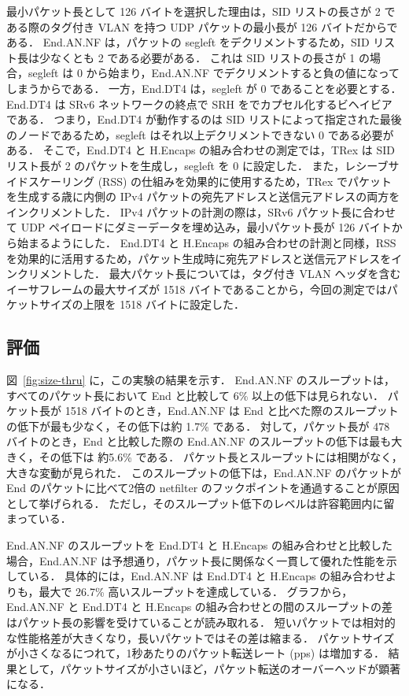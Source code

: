 最小パケット長として 126 バイトを選択した理由は，SID リストの長さが 2 である際のタグ付き VLAN を持つ UDP パケットの最小長が 126 バイトだからである．
End.AN.NF は，パケットの segleft をデクリメントするため，SID リスト長は少なくとも 2 である必要がある．
これは SID リストの長さが 1 の場合，segleft は 0 から始まり，End.AN.NF でデクリメントすると負の値になってしまうからである．
一方，End.DT4 は，segleft が 0 であることを必要とする．
End.DT4 は SRv6 ネットワークの終点で SRH をでカプセル化するビヘイビアである．
つまり，End.DT4 が動作するのは SID リストによって指定された最後のノードであるため，segleft はそれ以上デクリメントできない 0 である必要がある．
そこで，End.DT4 と H.Encaps の組み合わせの測定では，TRex は SID リスト長が 2 のパケットを生成し，segleft を 0 に設定した．
また，レシーブサイドスケーリング (RSS) の仕組みを効果的に使用するため，TRex でパケットを生成する歳に内側の IPv4 パケットの宛先アドレスと送信元アドレスの両方をインクリメントした．
IPv4 パケットの計測の際は，SRv6 パケット長に合わせて UDP ペイロードにダミーデータを埋め込み，最小パケット長が 126 バイトから始まるようにした．
End.DT4 と H.Encaps の組み合わせの計測と同様，RSS を効果的に活用するため，パケット生成時に宛先アドレスと送信元アドレスをインクリメントした．
最大パケット長については，タグ付き VLAN ヘッダを含むイーサフレームの最大サイズが 1518 バイトであることから，今回の測定ではパケットサイズの上限を 1518 バイトに設定した．

\subsection{評価}
\label{ssec:thru-size.eval}
図~\ref{fig:size-thru} に，この実験の結果を示す．
End.AN.NF のスループットは，すべてのパケット長において End と比較して 6\% 以上の低下は見られない．
パケット長が 1518 バイトのとき，End.AN.NF は End と比べた際のスループットの低下が最も少なく，その低下は約 1.7\% である．
対して，パケット長が 478 バイトのとき，End と比較した際の End.AN.NF のスループットの低下は最も大きく，その低下は 約5.6\% である．
パケット長とスループットには相関がなく，大きな変動が見られた．
このスループットの低下は，End.AN.NF のパケットが End のパケットに比べて2倍の netfilter のフックポイントを通過することが原因として挙げられる．
ただし，そのスループット低下のレベルは許容範囲内に留まっている．

End.AN.NF のスループットを End.DT4 と H.Encaps の組み合わせと比較した場合，End.AN.NF は予想通り，パケット長に関係なく一貫して優れた性能を示している．
具体的には，End.AN.NF は End.DT4 と H.Encaps の組み合わせよりも，最大で 26.7\% 高いスループットを達成している．
グラフから，End.AN.NF と End.DT4 と H.Encaps の組み合わせとの間のスループットの差はパケット長の影響を受けていることが読み取れる．
短いパケットでは相対的な性能格差が大きくなり，長いパケットではその差は縮まる．
パケットサイズが小さくなるにつれて，1秒あたりのパケット転送レート (pps) は増加する．
結果として，パケットサイズが小さいほど，パケット転送のオーバーヘッドが顕著になる．

